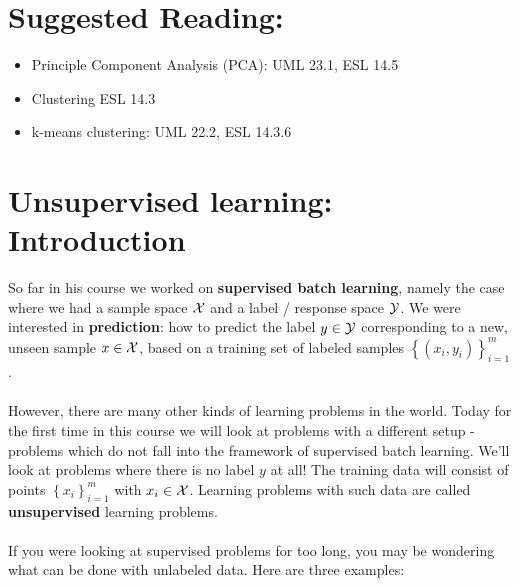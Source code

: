 \section*{Suggested Reading:}
\begin{itemize}
  \item Principle Component Analysis (PCA): UML 23.1, ESL 14.5
  \item Clustering ESL 14.3
  \item k-means clustering: UML 22.2, ESL 14.3.6
\end{itemize}

\section{Unsupervised learning: Introduction}

So far in his course we worked on {\bf supervised batch learning}, namely the case
where we had a sample space $\mathcal{X}$ and a label / response space $\mathcal{Y}$. We were
interested in {\bf prediction}: how to predict the label $y\in\mathcal{Y}$ corresponding
to a new, unseen
sample $x\in \mathcal{X}$, based on a training set of labeled samples 
$\left\{ (x_i,y_i) \right\}_{i=1}^m$.
\\~\\
However, there are many other kinds of learning problems in the world. Today for
the first time in this course we
will look at problems with a different setup - problems which do not fall into
the framework of supervised batch learning. We'll look at problems where there
is no label $y$ at all! The training data will consist of points
$\left\{ x_i \right\}_{i=1}^m$ with $x_i\in\mathcal{X}$. Learning problems with such data
are called {\bf unsupervised} learning problems.
\\~\\
If you were looking at supervised problems for too long, you may be wondering
what can be done with unlabeled data. Here are three examples:

